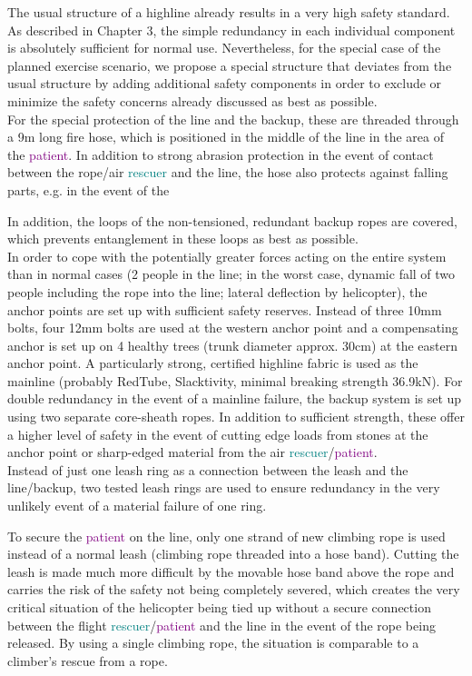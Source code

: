 \documentclass[a4paper,10pt]{scrartcl}
\begin{document}
The usual structure of a highline already results in a very high safety standard. As described in Chapter 3, the simple redundancy in each individual component is absolutely sufficient for normal use. Nevertheless, for the special case of the planned exercise scenario, we propose a special structure that deviates from the usual structure by adding additional safety components in order to exclude or minimize the safety concerns already discussed as best as possible.\\
For the special protection of the line and the backup, these are threaded through a 9m long fire hose, which is positioned in the middle of the line in the area of the \textcolor{purple}{patient}. In addition to strong abrasion protection in the event of contact between the rope/air \textcolor{teal}{rescuer} and the line, the hose also protects against falling parts, e.g. in the event of the

In addition, the loops of the non-tensioned, redundant backup ropes are covered, which prevents entanglement in these
loops as best as possible.\\
In order to cope with the potentially greater forces acting on the entire system than in normal cases (2 people in the line; in the worst case, dynamic fall of two people including the rope into the line; lateral deflection by helicopter), the anchor points are set up with sufficient safety reserves. Instead of three 10mm bolts, four 12mm bolts are used at the western
anchor point and a compensating anchor is set up on 4 healthy trees (trunk diameter approx. 30cm) at the eastern anchor point. A particularly strong, certified highline fabric is used as the mainline (probably RedTube, Slacktivity, minimal breaking strength 36.9kN). For double redundancy in the event of a mainline failure, the backup system is set up using two separate
core-sheath ropes. In addition to sufficient strength, these offer a higher level of safety in the event of cutting edge loads from stones at the anchor point or sharp-edged material from the air \textcolor{teal}{rescuer}/\textcolor{purple}{patient}. \\

Instead of just one leash ring as a connection between the leash and the line/backup, two tested leash rings are used to ensure redundancy in the very unlikely event of a material failure of one ring.

To secure the \textcolor{purple}{patient} on the line, only one strand of new climbing rope is used instead of a normal leash (climbing rope
threaded into a hose band). Cutting the leash is made much more difficult by the movable hose band above the rope and carries the risk of the safety not being completely severed, which creates the very critical situation of the helicopter being tied up without a secure connection between the flight \textcolor{teal}{rescuer}/\textcolor{purple}{patient} and the line in the event of the rope being released. By using a single climbing rope, the situation is comparable to a climber's rescue from a rope.
\end{document}
